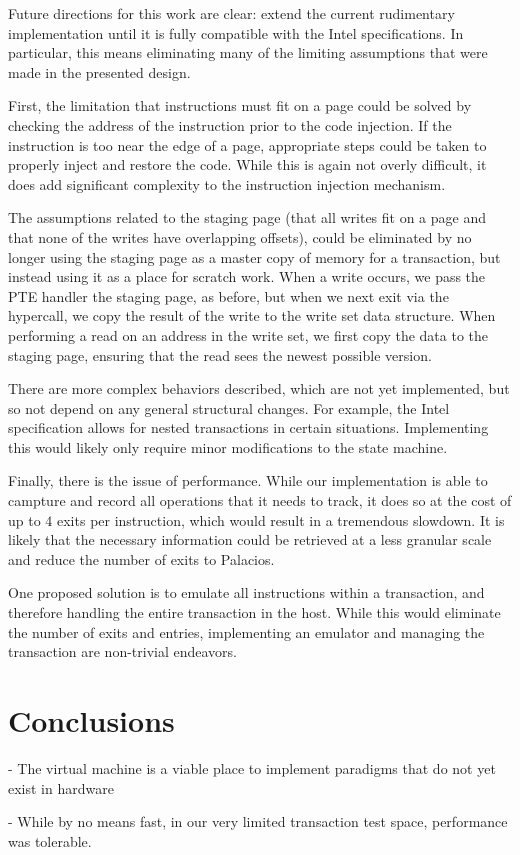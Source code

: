 \documentclass{acm_proc_article-sp}
\begin{document}
Future directions for this work are clear: extend the current rudimentary 
implementation until it is fully compatible with the Intel specifications. In
particular, this means eliminating many of the limiting assumptions that were
made in the presented design.

First, the limitation that instructions must fit on a page could be solved by
checking the address of the instruction prior to the code injection. If the 
instruction is too near the edge of a page, appropriate steps could be taken
to properly inject and restore the code. While this is again not overly 
difficult, it does add significant complexity to the instruction injection
mechanism.

The assumptions related to the staging page (that all writes fit on a page
and that none of the writes have overlapping offsets), could be eliminated
by no longer using the staging page as a master copy of memory for a 
transaction, but instead using it as a place for scratch work. When a 
write occurs, we pass the PTE handler the staging page, as before, but when we 
next exit via the hypercall, we copy the result of the write to the write set
data structure. When performing a read on an address in the write set,
we first copy the data to the staging page, ensuring that the read sees the
newest possible version.

There are more complex behaviors described, which are not yet
implemented, but so not depend on any general structural changes. For example,
the Intel specification allows for nested transactions in certain situations.
Implementing this would likely only require minor modifications to the state
machine. 

Finally, there is the issue of performance. While our implementation is able 
to campture and record all operations that it needs to track, it does so at the
cost of up to $4$ exits per instruction, which would result in a tremendous
slowdown. It is likely that the necessary information could be retrieved at a 
less granular scale and reduce the number of exits to Palacios.

One proposed solution is to emulate all instructions within a transaction,
and therefore handling the entire transaction in the host. While this would
eliminate the number of exits and entries, implementing an emulator and managing
the transaction are non-trivial endeavors. 
  
\section{Conclusions}

- The virtual machine is a viable place to implement paradigms that do not yet
exist in hardware

- While by no means fast, in our very limited transaction test space, 
performance was tolerable.


\end{document}
